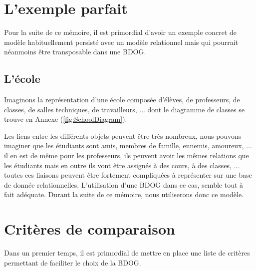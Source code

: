 \documentclass[a4paper,fleqn,12pt]{report}
\begin{document}
\section{L'exemple parfait}

Pour la suite de ce mémoire, il est primordial d'avoir un exemple concret de modèle habituellement persisté avec un modèle relationnel mais qui pourrait néanmoins être transposable dans une BDOG.

\subsection*{L'école}

Imaginons la représentation d'une école composée d'élèves, de professeurs, de classes, de salles techniques, de travailleurs, ... dont   le diagramme de classes se trouve en Annexe (\ref{fig:SchoolDiagram}).

Les liens entre les différents objets peuvent être très nombreux, nous pouvons imaginer que les étudiants sont amis, membres de famille, ennemis, amoureux, ... il en est de même pour les professeurs, ils peuvent avoir les mêmes relations que les étudiants mais en outre ils vont être assignés à des cours, à des classes, ... toutes ces liaisons peuvent être fortement compliquées à représenter sur une base de donnée relationnelles. L’utilisation d’une BDOG dans ce cas, semble tout à fait adéquate. Durant la suite de ce mémoire, nous utiliserons donc ce modèle.

\section{Critères de comparaison}

Dans un premier temps, il est primordial de mettre en place une liste de critères permettant de faciliter le choix de la BDOG.
\end{document}
